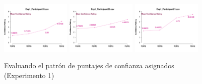 \begin{figure}[th]
\includegraphics[width=0.30\textwidth]{Figures/MirrorRating_Exp1_P19} \includegraphics[width=0.30\textwidth]{Figures/MirrorRating_Exp1_P20} \includegraphics[width=0.30\textwidth]{Figures/MirrorRating_Exp1_P21} 
\caption[MErating_Ex1]{Evaluando el patrón de puntajes de confianza asignados (Experimento 1)}
\label{fig:MERating_E1}
\end{figure}



